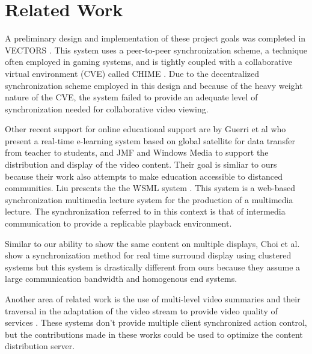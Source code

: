 \documentclass{sig-alternate}
\begin{document}
\section{Related Work} \label{related}

A preliminary design and implementation of these project goals was
completed in VECTORS \cite{VECTORS}.  This system uses a peer-to-peer
synchronization scheme, a technique often employed in gaming systems,
and is tightly coupled with a collaborative virtual environment (CVE)
called CHIME \cite{CHIME}.  Due to the decentralized synchronization
scheme employed in this design and because of the heavy weight nature
of the CVE, the system failed to provide an adequate level of
synchronization needed for collaborative video viewing.

Other recent support for online educational support are by Guerri et
al who present a real-time e-learning system based on global satellite
for data transfer from teacher to students, and JMF and Windows Media
\cite{GUERRI} to support the distribution and display of the video
content.  Their goal is simliar to ours because their work also
attempts to make education accessible to distanced communities.  Liu
presents the the WSML system \cite{LIU2}.  This system is a web-based
synchronization multimedia lecture system for the production of a
multimedia lecture.  The synchronization referred to in this context
is that of intermedia communication to provide a replicable playback
environment.

Similar to our ability to show the same content on multiple displays,
Choi et al. show a synchronization method for real time surround
display using clustered systems \cite{CHOI} but this system is
drastically different from ours because they assume a large
communication bandwidth and homogenous end systems.

Another area of related work is the use of multi-level video summaries
and their traversal in the adaptation of the video stream to provide
video quality of services
\cite{CUI,KRASIC,LEI,NEUMANN,SHIPMAN,TAN,THAKUR}.  These systems don't
provide multiple client synchronized action control, but the
contributions made in these works could be used to optimize the
content distribution server.
\end{document}
